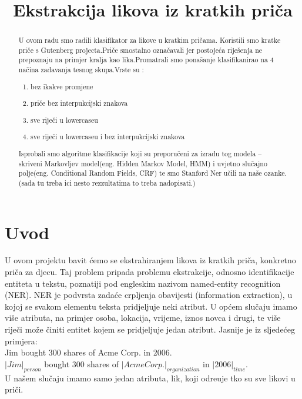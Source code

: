\documentclass[conference]{IEEEtran}
\begin{document}
\title{Ekstrakcija likova iz kratkih pri\v{c}a}
\author{
\and
{}}
\maketitle

\begin{abstract}
U ovom radu smo radili klasifikator za likove u kratkim pri\v{c}ama. Koristili smo kratke pri\v{c}e s Gutenberg projecta.Pri\v{c}e smostalno ozna\v{c}avali jer postoje\'ca rije\v{s}enja ne prepoznaju na primjer kralja kao lika.Promatrali smo pona\v{s}anje klasifikanirao na 4 na\v{c}ina zadavanja tesnog skupa.Vrste su :\begin{enumerate}
\item bez ikakve promjene
\item pri\v{c}e bez interpukcijski znakova
\item sve rije\v{c}i u lowercaseu
\item sve rije\v{c}i u lowercaseu i bez interpukcijski znakova
\end{enumerate} 
Isprobali smo algoritme klasifikacije koji su preporu\v{c}eni za izradu tog modela -- skriveni Markovljev model(eng. Hidden Markov Model, HMM) i uvjetno slu\v{c}ajno polje(eng. Conditional Random Fields, CRF) te smo Stanford Ner u\v{c}ili na na\v{s}e ozanke.
(sada tu treba ici nesto  rezzultatima to treba nadopisati.)     
\end{abstract}
\section{Uvod}
U ovom projektu bavit \'cemo se ekstrahiranjem likova iz kratkih pri\v{c}a, konkretno pri\v{c}a za djecu. Taj problem pripada problemu ekstrakcije, odnosno identifikacije entiteta u tekstu, poznatiji pod engleskim nazivom named-entity recognition (NER). NER je podvrsta zada\'ce crpljenja obavijesti (information
extraction), u kojoj se svakom elementu teksta pridjeljuje neki atribut. U op\'cem
slu\v{c}aju imamo vi\v{s}e atributa, na primjer osoba, lokacija, vrijeme, iznos novca i
drugi, te vi\v{s}e rije\v{c}i mo\v{z}e \v{c}initi entitet kojem se pridjeljuje jedan atribut. Jasnije
je iz sljede\'ceg primjera:\\
Jim bought 300 shares of Acme Corp. in 2006.\\
$|Jim|_{person}$ bought 300 shares of $|Acme Corp.|_{organization}$ in $|2006|_{time}$.\\
U na\v{s}em slu\v{c}aju imamo samo jedan atributa, lik, koji odre\dj{}uje tko su sve likovi u pri\v{c}i.
\end{document}
